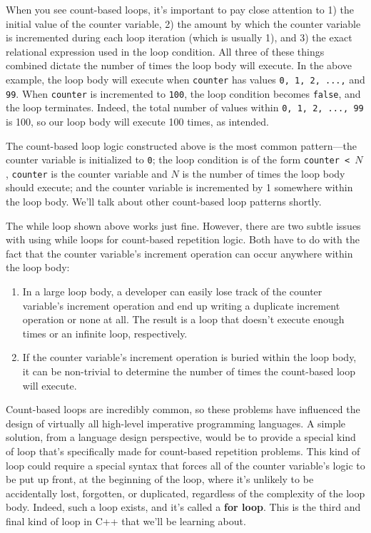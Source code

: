 \documentclass{article}
\begin{document}
When you see count-based loops, it's important to pay close attention to 1) the initial value of the counter variable, 2) the amount by which the counter variable is incremented during each loop iteration (which is usually 1), and 3) the exact relational expression used in the loop condition. All three of these things combined dictate the number of times the loop body will execute. In the above example, the loop body will execute when \texttt{counter} has values \texttt{0, 1, 2, ...,} and \texttt{99}. When \texttt{counter} is incremented to \texttt{100}, the loop condition becomes \texttt{false}, and the loop terminates. Indeed, the total number of values within \texttt{0, 1, 2, ..., 99} is 100, so our loop body will execute 100 times, as intended.

The count-based loop logic constructed above is the most common pattern---the counter variable is initialized to \texttt{0}; the loop condition is of the form \texttt{counter < $N$}, \texttt{counter} is the counter variable and $N$ is the number of times the loop body should execute; and the counter variable is incremented by 1 somewhere within the loop body. We'll talk about other count-based loop patterns shortly.

The while loop shown above works just fine. However, there are two subtle issues with using while loops for count-based repetition logic. Both have to do with the fact that the counter variable's increment operation can occur anywhere within the loop body:

\begin{enumerate}
    \item In a large loop body, a developer can easily lose track of the counter variable's increment operation and end up writing a duplicate increment operation or none at all. The result is a loop that doesn't execute enough times or an infinite loop, respectively.
    \item If the counter variable's increment operation is buried within the loop body, it can be non-trivial to determine the number of times the count-based loop will execute.
\end{enumerate}

Count-based loops are incredibly common, so these problems have influenced the design of virtually all high-level imperative programming languages. A simple solution, from a language design perspective, would be to provide a special kind of loop that's specifically made for count-based repetition problems. This kind of loop could require a special syntax that forces all of the counter variable's logic to be put up front, at the beginning of the loop, where it's unlikely to be accidentally lost, forgotten, or duplicated, regardless of the complexity of the loop body. Indeed, such a loop exists, and it's called a \textbf{for loop}. This is the third and final kind of loop in C++ that we'll be learning about.
\end{document}
